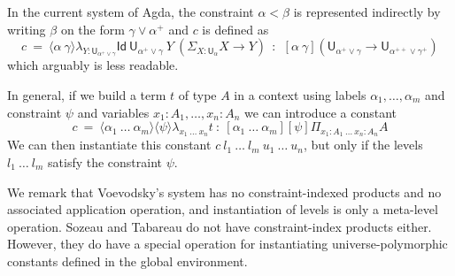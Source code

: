 \documentclass[11pt,a4paper]{article}
\theoremstyle{definition}
\newcommand{\Id}{\mathsf{Id}}
\newcommand{\UU}{\mathsf{U}}
\newcommand{\lam}[1]{{\langle}#1{\rangle}}
\begin{document}
\medskip


In the current system of Agda, the constraint $\alpha<\beta$ is represented indirectly by
writing $\beta$ on the form $\gamma\vee \alpha^+$ and $c$ is defined as
$$
c~=~\lam{\alpha~\gamma}\lambda_{Y:\UU_{\alpha^+\vee\gamma}}\Id~{\UU_{\alpha^+\vee\gamma}}~Y~ (\Sigma_{X:\UU_{\alpha}}X\rightarrow Y)~~:~~[\alpha~\gamma]  (\UU_{\alpha^+\vee\gamma} \rightarrow \UU_{\alpha^{++}\vee\gamma^+})
$$
   which arguably is less readable.

\medskip

In general, if we  build a term $t$ of type $A$ in a context using labels $\alpha_1,\dots,\alpha_m$
and constraint $\psi$ and variables $x_1:A_1,\dots,x_n:A_n$ we can introduce a constant
$$
c~=~ \lam{\alpha_1~\dots~\alpha_m}\lam{\psi}\lambda_{x_1~\dots~x_n}t ~:~
[\alpha_1~\dots~\alpha_m][\psi]\Pi_{x_1:A_1~\dots~x_n:A_n}A
$$
We can then instantiate this constant $c~l_1~\dots~l_m~u_1~\dots~u_n$, but only if the levels
$l_1~\dots~l_m$ satisfy the constraint $\psi$.

We remark that Voevodsky's system \cite{VV} has no constraint-indexed products and no associated application operation, and instantiation of levels is only a meta-level operation. Sozeau and Tabareau \cite{SozeauTabareau:coq} do not have constraint-index products either. However, they do have a special operation %
 for instantiating universe-polymorphic constants defined in the global environment.
%



\end{document}
